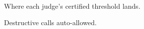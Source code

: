 \documentclass[conference]{IEEEtran}
\begin{document}
\begin{figure}[t]\centering\caption{Where each judge's certified threshold lands.}\end{figure}
\begin{figure}[t]\centering\caption{Destructive calls auto-allowed.}\end{figure}
\end{document}
